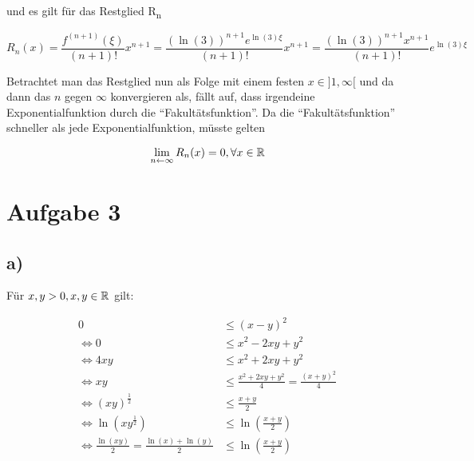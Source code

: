 \documentclass[a4paper, 11pt]{article}
\begin{document}
und es gilt für das Restglied R\textsubscript{n}

\begin{equation*}
    R_n(x) = \frac{f^{(n+1)}(\xi)}{(n+1)!}x^{n+1}
        = \frac{ (\ln(3))^{n+1} e^{\ln(3)\xi}}{(n+1)!}x^{n+1}
        = \frac{ (\ln(3))^{n+1} x^{n+1}}{(n+1)!} e^{\ln(3)\xi}
\end{equation*}

Betrachtet man das Restglied nun als Folge mit einem festen \(x \in ]1, \infty[\)
und da dann das \(n\) gegen \(\infty\) konvergieren als, fällt auf, dass irgendeine
Exponentialfunktion durch die "`Fakultätsfunktion"'. Da die "`Fakultätsfunktion"'
schneller als jede Exponentialfunktion, müsste gelten

\begin{equation*}
    \lim_{n \leftarrow \infty} R_n(x) = 0, \forall x \in \mathbb{R}
\end{equation*}

\section{Aufgabe 3}
\label{sec:org838d482}
\subsection{a)}
\label{sec:org6cb7490}
Für \(x,y > 0, x,y \in \mathbb{R}\) gilt:

\begin{align*}
    0 &\leq (x-y)^2 \\
    \Leftrightarrow 0 &\leq x^2 -2xy+y^2 \\
    \Leftrightarrow 4xy &\leq x^2 + 2xy + y^2 \\
    \Leftrightarrow xy &\leq \frac{x^2+2xy+y^2}{4} = \frac{(x+y)^2}{4} \\
    \Leftrightarrow (xy)^{\frac{1}{2}} &\leq \frac{x+y}{2} \\
    \Leftrightarrow \ln(xy^{\frac{1}{2}}) &\leq \ln\left(\frac{x+y}{2}\right) \\
    \Leftrightarrow \frac{\ln(xy)}{2} = \frac{\ln(x) + \ln(y)}{2} &\leq \ln\left(\frac{x+y}{2}\right)
\end{align*}
\end{document}
